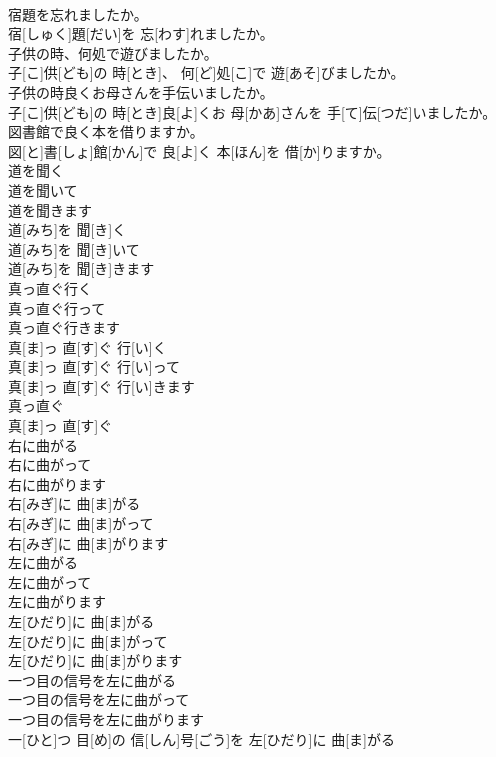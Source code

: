 \documentclass[8pt]{extreport}
\begin{document}
\begin{CJK}{UTF8}{min}
\\	宿題を忘れましたか。	
\\	宿[しゅく]題[だい]を 忘[わす]れましたか。
\\	子供の時、何処で遊びましたか。	
\\	子[こ]供[ども]の 時[とき]、 何[ど]処[こ]で 遊[あそ]びましたか。
\\	子供の時良くお母さんを手伝いましたか。	
\\	子[こ]供[ども]の 時[とき]良[よ]くお 母[かあ]さんを 手[て]伝[つだ]いましたか。
\\	図書館で良く本を借りますか。	
\\	図[と]書[しょ]館[かん]で 良[よ]く 本[ほん]を 借[か]りますか。
\\	道を聞く 
\\	道を聞いて 
\\	道を聞きます	
\\	道[みち]を 聞[き]く 
\\	道[みち]を 聞[き]いて 
\\	道[みち]を 聞[き]きます
\\	真っ直ぐ行く 
\\	真っ直ぐ行って 
\\	真っ直ぐ行きます	
\\	真[ま]っ 直[す]ぐ 行[い]く 
\\	真[ま]っ 直[す]ぐ 行[い]って 
\\	真[ま]っ 直[す]ぐ 行[い]きます
\\	真っ直ぐ	
\\	真[ま]っ 直[す]ぐ	
\\	右に曲がる 
\\	右に曲がって 
\\	右に曲がります	
\\	右[みぎ]に 曲[ま]がる 
\\	右[みぎ]に 曲[ま]がって 
\\	右[みぎ]に 曲[ま]がります
\\	左に曲がる 
\\	左に曲がって 
\\	左に曲がります	
\\	左[ひだり]に 曲[ま]がる 
\\	左[ひだり]に 曲[ま]がって 
\\	左[ひだり]に 曲[ま]がります
\\	一つ目の信号を左に曲がる 
\\	一つ目の信号を左に曲がって 
\\	一つ目の信号を左に曲がります	
\\	一[ひと]つ 目[め]の 信[しん]号[ごう]を 左[ひだり]に 曲[ま]がる 

\end{CJK}
\end{document}
